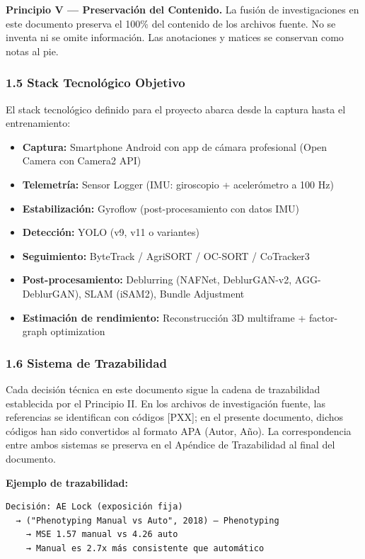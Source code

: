 \textbf{Principio V — Preservación del Contenido.} La fusión de investigaciones en este documento preserva el 100\% del contenido de los archivos fuente. No se inventa ni se omite información. Las anotaciones y matices se conservan como notas al pie.


\subsubsection{1.5 Stack Tecnológico Objetivo}


El stack tecnológico definido para el proyecto abarca desde la captura hasta el entrenamiento:


\begin{itemize}
\item \textbf{Captura:} Smartphone Android con app de cámara profesional (Open Camera con Camera2 API)
\item \textbf{Telemetría:} Sensor Logger (IMU: giroscopio + acelerómetro a 100 Hz)
\item \textbf{Estabilización:} Gyroflow (post-procesamiento con datos IMU)
\item \textbf{Detección:} YOLO (v9, v11 o variantes)
\item \textbf{Seguimiento:} ByteTrack / AgriSORT / OC-SORT / CoTracker3
\item \textbf{Post-procesamiento:} Deblurring (NAFNet, DeblurGAN-v2, AGG-DeblurGAN), SLAM (iSAM2), Bundle Adjustment
\item \textbf{Estimación de rendimiento:} Reconstrucción 3D multiframe + factor-graph optimization
\end{itemize}

\subsubsection{1.6 Sistema de Trazabilidad}


Cada decisión técnica en este documento sigue la cadena de trazabilidad establecida por el Principio II. En los archivos de investigación fuente, las referencias se identifican con códigos [PXX]; en el presente documento, dichos códigos han sido convertidos al formato APA (Autor, Año). La correspondencia entre ambos sistemas se preserva en el Apéndice de Trazabilidad al final del documento.


\textbf{Ejemplo de trazabilidad:}

\begin{verbatim}
Decisión: AE Lock (exposición fija)
  → ("Phenotyping Manual vs Auto", 2018) — Phenotyping
    → MSE 1.57 manual vs 4.26 auto
    → Manual es 2.7x más consistente que automático
\end{verbatim}


